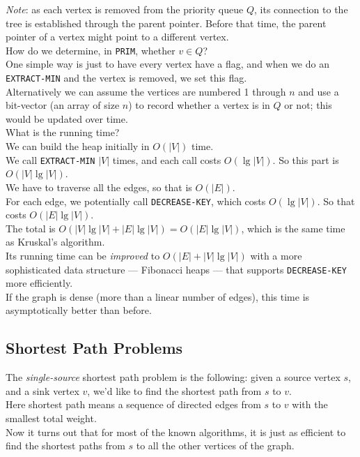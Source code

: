 \documentclass[12pt]{article}
\theoremstyle{plain}
\theoremstyle{definition}
\begin{document}
\emph{Note}: as each vertex is removed from the priority queue $Q$, its connection to the tree is established through the parent pointer.
Before that time, the parent pointer of a vertex might point to a different vertex. \\

How do we determine, in \texttt{PRIM}, whether $v \in Q$? \\
One simple way is just to have every vertex have a flag, and when we do an \texttt{EXTRACT-MIN} and the vertex is removed, we set this flag. \\
Alternatively we can assume the vertices are numbered 1 through $n$ and use a bit-vector (an array of size $n$) to record whether a vertex is in $Q$ or not;
this would be updated over time. \\

What is the running time? \\
We can build the heap initially in $O(|V|)$ time. \\
We call \texttt{EXTRACT-MIN} $|V|$ times, and each call costs $O(\lg{|V|})$.
So this part is $O(|V|\lg{|V|})$. \\
We have to traverse all the edges, so that is $O(|E|)$. \\
For each edge, we potentially call \texttt{DECREASE-KEY}, which costs $O(\lg{|V|})$.
So that costs $O(|E|\lg{|V|})$. \\
The total is $O(|V|\lg{|V|} + |E|\lg{|V|}) = O(|E|\lg{|V|})$, which is the same time as Kruskal's algorithm. \\

Its running time can be \emph{improved} to $O(|E| + |V|\lg{|V|})$ with a more sophisticated data structure --- Fibonacci heaps --- that supports \texttt{DECREASE-KEY} more efficiently. \\
If the graph is dense (more than a linear number of edges), this time is asymptotically better than before.

\subsection{Shortest Path Problems}
The \emph{single-source} shortest path problem is the following: given a source vertex $s$, and a sink vertex $v$, we'd like to find the shortest path from $s$ to $v$. \\
Here shortest path means a sequence of directed edges from $s$ to $v$ with the smallest total weight. \\
Now it turns out that for most of the known algorithms, it is just as efficient to find the shortest paths from $s$ to all the other vertices of the graph. \\
\end{document}
